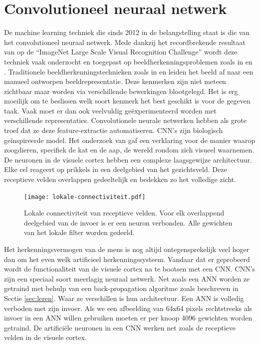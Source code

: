 \section{Convolutioneel neuraal netwerk}
De machine learning techniek die sinds 2012 in de belangstelling staat is die van het convolutioneel neuraal netwerk. Mede dankzij het recordbrekende resultaat van \cite{cnn-krizhevsky} op de ``ImageNet Large Scale Visual Recognition Challenge'' wordt deze techniek vaak onderzocht en toegepast op beeldherkenningsproblemen zoals in \cite{cnn-ji} en \cite{cnn-karpathy}.
\npar Traditionele beeldherkenningstechnieken zoals in \cite{perronnin2010improving} en \cite{jhuang2007biologically} leiden het beeld af naar een manueel ontworpen beeldrepresentatie. Deze kenmerken zijn niet meteen zichtbaar maar worden via verschillende bewerkingen blootgelegd. Het is erg moeilijk om te beslissen welk soort kenmerk het best geschikt is voor de gegeven taak. Vaak moet er dan ook veelvuldig ge\"experimenteerd worden met verschillende representaties.
\npar Convolutionele neurale netwerken hebben als grote troef dat ze deze feature-extractie automatiseren. CNN's zijn biologisch ge\"inspireerde model. Het onderzoek van \cite{hubel1968receptive} gaf een verklaring voor de manier waarop zoogdieren, specifiek de kat en de aap, de wereld rondom zich visueel waarnemen. De neuronen in de visuele cortex hebben een complexe laagsgewijze architectuur. Elke cel reageert op prikkels in een deelgebied van het gezichtsveld. Deze receptieve velden overlappen gedeeltelijk en bedekken zo het volledige zicht.
\begin{figure}[t!]
	\centering
	\texttt{[image: lokale-connectiviteit.pdf]}
	\caption{Lokale connectiviteit van receptieve velden. Voor elk overlappend deelgebied van de invoer is er een neuron verbonden. Alle gewichten van het lokale filter worden gedeeld.}
	\label{fig:lokale-connectiviteit}
\end{figure}
\npar Het herkenningsvermogen van de mens is nog altijd ontegensprekelijk veel hoger dan om het even welk artificieel herkenningssysteem. Vandaar dat er geprobeerd wordt de functionaliteit van de visuele cortex na te bootsen met een CNN. 
\npar CNN's zijn een speciaal soort meerlagig neuraal netwerk. Net zoals een ANN worden ze getraind met behulp van een back-propagation algoritme zoals beschreven in Sectie \ref{sec:leren}. Waar ze verschillen is hun architectuur. Een ANN is volledig verboden met zijn invoer. Als we een afbeelding van 64x64 pixels rechtstreeks als invoer in een ANN willen gebruiken moeten er per knoop 4096 gewichten worden getraind. De artifici\"ele neuronen in een CNN werken net zoals de receptieve velden in de visuele cortex.

